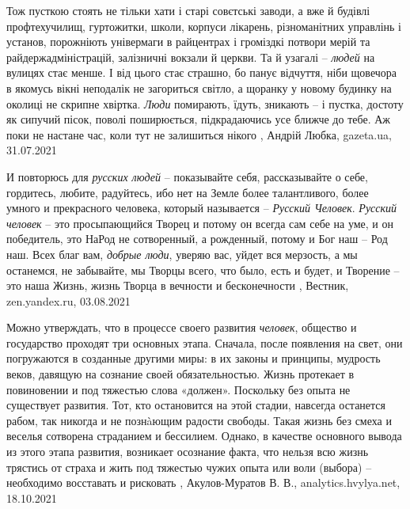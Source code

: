 Тож пусткою стоять не тільки хати і старі совєтські заводи, а вже й будівлі
профтехучилищ, гуртожитки, школи, корпуси лікарень, різноманітних управлінь і
установ, порожніють універмаги в райцентрах і громіздкі потвори мерій та
райдержадміністрацій, залізничні вокзали й церкви. Та й узагалі – \emph{людей} на
вулицях стає менше. І від цього стає страшно, бо панує відчуття, ніби щовечора
в якомусь вікні неподалік не загориться світло, а щоранку у новому будинку на
околиці не скрипне хвіртка. \emph{Люди} помирають, їдуть, зникають – і пустка, достоту
як сипучий пісок, поволі поширюється, підкрадаючись усе ближче до тебе. Аж поки
не настане час, коли тут не залишиться нікого
, 
Андрій Любка, gazeta.ua, 31.07.2021

И повторюсь для \emph{русских людей} – показывайте себя, рассказывайте о себе,
гордитесь, любите, радуйтесь, ибо нет на Земле более талантливого, более умного
и прекрасного человека, который называется – \emph{Русский Человек}.  \emph{Русский человек}
– это просыпающийся Творец и потому он всегда сам себе на уме, и он победитель,
это НаРод не сотворенный, а рожденный, потому и Бог наш – Род наш.  Всех благ
вам, \emph{добрые люди}, уверяю вас, уйдет вся мерзость, а мы останемся, не забывайте,
мы Творцы всего, что было, есть и будет, и Творение – это наша Жизнь, жизнь
Творца в вечности и бесконечности
, Вестник, zen.yandex.ru, 03.08.2021

Можно утверждать, что в процессе своего развития \emph{человек}, общество и
государство проходят три основных этапа. Сначала, после появления на свет, они
погружаются в созданные другими миры: в их законы и принципы, мудрость веков,
давящую на сознание своей обязательностью. Жизнь протекает в повиновении и под
тяжестью слова «должен». Поскольку без опыта не существует развития. Тот, кто
остановится на этой стадии, навсегда останется рабом, так никогда и не
познàющим радости свободы. Такая жизнь без смеха и веселья сотворена страданием
и бессилием. Однако, в качестве основного вывода из этого этапа развития,
возникает осознание факта, что нельзя всю жизнь трястись от страха и жить под
тяжестью чужих опыта или воли (выбора) – необходимо восставать и рисковать
, 
Акулов-Муратов В. В., analytics.hvylya.net, 18.10.2021

